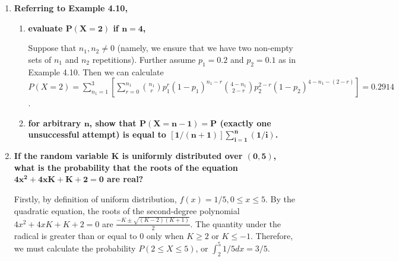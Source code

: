 \documentclass[10pt, oneside]{article}
\begin{document}
\begin{enumerate}[label=4.\arabic*]
\begin{enumerate}
	If the probability of success on the $i$-th repetition is $P(i) = \frac{i+1}{i+2}$, then to not be successful on the $i$-th probability is $1 - \frac{i+1}{i+2}$. Assuming each repetition is independent of one another, then we can calculate $\Pi_{i=1}^7 (1 - \frac{i+1}{i+2}) (9/10) = \boxed{2.6 \cdot 10^{-6}}$.
	
	\end{enumerate}

\item  \begin{tcolorbox}[
  colback=Cerulean!5!white,
  colframe=Cerulean!75!black]
\textbf{Referring to Example 4.10,}
\end{tcolorbox}

	\begin{enumerate}
	\item  \begin{tcolorbox}[
	  colback=Cerulean!5!white,
	  colframe=Cerulean!75!black]
	\textbf{evaluate $\bm{P(X = 2)}$ if $\bm{n=4}$,}
	\end{tcolorbox}
	
	Suppose that $n_1, n_2 \neq 0$ (namely, we ensure that we have two non-empty sets of $n_1$ and $n_2$ repetitions). Further assume $p_1 = 0.2$ and $p_2 = 0.1$ as in Example 4.10. Then we can calculate $P(X = 2) = \sum^3_{n_1 = 1} [ \sum^{n_1}_{r=0} \binom{n_1}{r} p_1^r (1 - p_1)^{n_1 - r} \binom{4 - n_1}{2 - r} p_2^{2-r} (1 - p_2)^{4 - n_1 - (2-r)} ] = \boxed{0.2914}$.
	
	\item  \begin{tcolorbox}[
	  colback=Cerulean!5!white,
	  colframe=Cerulean!75!black]
	\textbf{for arbitrary $\bm{n}$, show that $\bm{P(X = n - 1) = P}$ (exactly one unsuccessful attempt) is equal to $\bm{[1 / (n+1)] \sum^n_{i=1} (1/i)}$.}
	\end{tcolorbox}
		
	\end{enumerate}

\item  \begin{tcolorbox}[
  colback=Cerulean!5!white,
  colframe=Cerulean!75!black]
\textbf{If the random variable $\bm{K}$ is uniformly distributed over $\bm{(0,5)}$, what is the probability that the roots of the equation $\bm{4x^2 + 4xK + K + 2 = 0}$ are real?}
\end{tcolorbox}

Firstly, by definition of uniform distribution, $f(x) = 1/5, 0 \leq x \leq 5$. By the quadratic equation, the roots of the second-degree polynomial $4x^2 + 4xK + K + 2 = 0$ are $\frac{-K \pm \sqrt{(K - 2) (K + 1)}}{2}$. The quantity under the radical is greater than or equal to $0$ only when $K \geq 2$ or $K \leq -1$. Therefore, we must calculate the probability $P(2 \leq X \leq 5)$, or $\int^5_2 1/5 dx = \boxed{3/5}$. 


\end{enumerate}
\end{document}
